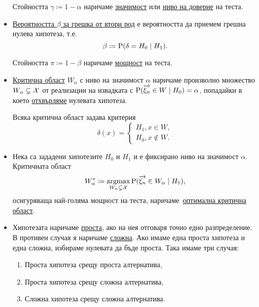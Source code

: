 \documentclass[numbers=endperiod, DIV=15, bibliography=totocnumbered]{scrartcl}
\begin{document}
\begin{definition}[Хипотези]
\begin{itemize}
    Стойността $\gamma \coloneqq 1 - \alpha$ наричаме \uline{значимост} или \uline{ниво на доверие} на теста.

    \item \uline{Вероятността $\beta$ за грешка от втори род} е вероятността да приемем грешна нулева хипотеза, т.е.
    \begin{displaymath}
      \beta \coloneqq \operatorname{P}(\delta = H_0 \mid H_1).
    \end{displaymath}

    Стойността $\pi \coloneqq 1 - \beta$ наричаме \uline{мощност} на теста.

    \item \uline{Критична област} $W_\alpha$ с ниво на значимост $\alpha$ наричаме произволно множество $W_\alpha \subsetneq \mathcal{X}$ от реализации на извадката с $\operatorname{P}(\overrightarrow{\xi_n} \in W \mid H_0) = \alpha$, попадайки в което \uline{отхвърляме} нулевата хипотеза.

    Всяка критична област задава критерия
    \begin{displaymath}
      \delta(x) = \begin{cases}
        H_1, x \in W, \\
        H_0, x \not\in W.
      \end{cases}
    \end{displaymath}

    \item Нека са зададени хипотезите $H_0$ и $H_1$ и е фиксирано ниво на значимост $\alpha$. Критичната област
    \begin{displaymath}
      W_\alpha^* \coloneqq \operatorname*{\operatorname{argmax}}_{W_\alpha \subsetneq \mathcal{X}} \operatorname{P}(\overrightarrow{\xi_n} \in W_\alpha \mid H_1),
    \end{displaymath}
    осигуряваща най-голяма мощност на теста, наричаме~\uline{оптимална критична област}.

    \item Хипотезата наричаме \uline{проста}, ако на нея отговаря точно едно разпределение. В противен случая я наричаме \uline{сложна}. Ако имаме една проста хипотеза и една сложна, избираме нулевата да бъде проста. Така имаме три случая:
    \begin{enumerate}
      \item Проста хипотеза срещу проста алтернатива,
      \item Проста хипотеза срещу сложна алтернатива,
      \item Сложна хипотеза срещу сложна алтернатива.
    \end{enumerate}


\end{itemize}
\end{definition}
\end{document}
